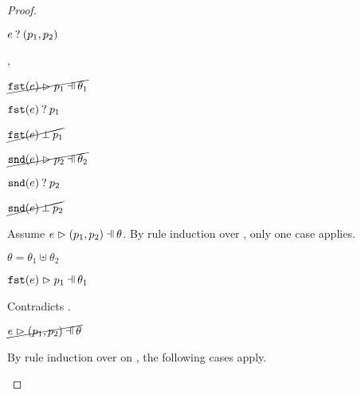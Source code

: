 \begin{proof}
\begin{byCases}
\begin{byCases}
\begin{byCases}
\begin{byCases}
\begin{pfsteps*}
                \item $e \mathbin{?} (p_1 , p_2)$ 
                \end{pfsteps*}
            \end{byCases}
        \item[\hmaymatch{\hfst{e}}{p_1},\hmaymatch{\hsnd{e}}{p_2}]
            \begin{pfsteps*}
            \item $\cancel{\hpatmatch{\hfst{e}}{p_1}{\theta_1}}$  
            \item $\mathtt{fst}(e) \mathbin{?} p_1$  
            \item $\cancel{\mathtt{fst}(e) \mathbin{\bot} p_1}$  
            \item $\cancel{\hpatmatch{\hsnd{e}}{p_2}{\theta_2}}$  
            \item $\mathtt{snd}(e) \mathbin{?} p_2$  
            \item $\cancel{\mathtt{snd}(e) \mathbin{\bot} p_2}$  
            \end{pfsteps*}
            Assume $\hpatmatch{e}{\hpair{p_1}{p_2}}{\theta}$. By rule induction over , only one case applies.
            \begin{byCases}
            \item[\text{(\ref{rule:MNotIntroPair})}]
                \begin{pfsteps*}
                \item $\theta=\theta_1\uplus\theta_2$ 
                \item $\hpatmatch{\hfst{e}}{p_1}{\theta_1}$  
                \end{pfsteps*}
                Contradicts .
            \end{byCases}
            \begin{pfsteps*}
            \item $\cancel{\hpatmatch{e}{\hpair{p_1}{p_2}}{\theta}}$ 
            \end{pfsteps*}
            By rule induction over  on , the following cases apply.

\end{byCases}
\end{byCases}
\end{byCases}
\end{proof}
